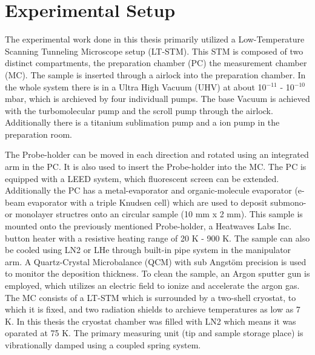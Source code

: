 \section{Experimental Setup}
\label{sec:versuchsandordnung}
The experimental work done in this thesis primarily utilized a Low-Temperature Scanning Tunneling Microscope setup (LT-STM).
This STM is composed of two distinct compartments, the preparation chamber (PC) the measurement chamber (MC).
The sample is inserted through a airlock into the preparation chamber.
In the whole system there is in a Ultra High Vacuum (UHV) at about 10$^{-11}$ - 10$^{-10}$ mbar, which is archieved by four individuall pumps.
The base Vacuum is achieved with the turbomolecular pump and the scroll pump through the airlock.
Additionally there is a titanium sublimation pump and a ion pump in the preparation room.


The Probe-holder can be moved in each direction and rotated using an integrated arm in the PC.
It is also used to insert the Probe-holder into the MC.
The PC is equipped with a LEED system, which fluorescent screen can be extended. 
Additionally the PC has a metal-evaporator and organic-molecule evaporator (e-beam evaporator with a triple Knudsen cell) which are used to deposit submono- or monolayer structres onto an circular sample (10 mm x 2 mm).
This sample is mounted onto the previously mentioned Probe-holder, a Heatwaves Labs Inc. button heater with a resistive heating range of 20 K - 900 K.
The sample can also be cooled using LN2 or LHe through built-in pipe system in the manipulator arm.
A Quartz-Crystal Microbalance (QCM) with sub Angstöm precision is used to monitor the deposition thickness.
To clean the sample, an Argon sputter gun is employed, which utilizes an electric field to ionize and accelerate the argon gas.
The MC consists of a LT-STM which is surrounded by a two-shell cryostat, to which it is fixed, and two radiation shields to archieve temperatures as low as 7 K.
In this thesis the cryostat chamber was filled with LN2 which means it was oparated at 75 K.
The primary measuring unit (tip and sample storage place) is vibrationally damped using a coupled spring system.